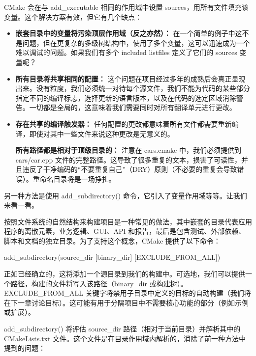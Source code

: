 CMake 会在与 add\_executable 相同的作用域中设置 sources，用所有文件填充该变量。这个解决方案有效，但它有几个缺点：

\begin{itemize}
\item
\textbf{嵌套目录中的变量将污染顶层作用域（反之亦然）：} 在一个简单的例子中这不是问题，但在更复杂的多级树结构中，使用了多个变量，这可以迅速成为一个难以调试的问题。如果我们有多个 included listfiles 定义了它们的 sources 变量呢？

\item
 \textbf{所有目录将共享相同的配置：} 这个问题在项目经过多年的成熟后会真正显现出来。没有粒度，我们必须统一对待每个源文件，我们不能为代码的某些部分指定不同的编译标志，选择更新的语言版本，以及在代码的选定区域消除警告。一切都是全局的，这意味着我们需要同时对所有翻译单元进行更改。

\item
\textbf{存在共享的编译触发器：} 任何配置的更改都意味着所有文件都需要重新编译，即使对其中一些文件来说这种更改是无意义的。

\textbf{所有路径都是相对于顶级目录的：} 注意在 cars.cmake 中，我们必须提供到 cars/car.cpp 文件的完整路径。这导致了很多重复的文本，损害了可读性，并且违反了干净编码的“不要重复自己”（DRY）原则（不必要的重复会导致错误）。重命名目录将是一场挣扎。
\end{itemize}

另一种方法是使用 add\_subdirectory() 命令，它引入了变量作用域等等。让我们来看一看。


按照文件系统的自然结构来构建项目是一种常见的做法，其中嵌套的目录代表应用程序的离散元素，业务逻辑、GUI、API 和报告，最后是包含测试、外部依赖、脚本和文档的独立目录。为了支持这个概念，CMake 提供了以下命令：

\begin{shell}
add_subdirectory(source_dir [binary_dir] [EXCLUDE_FROM_ALL])
\end{shell}

正如已经确立的，这将添加一个源目录到我们的构建中。可选地，我们可以提供一个路径，构建的文件将写入该路径（binary\_dir 或构建树）。EXCLUDE\_FROM\_ALL 关键字将禁用子目录中定义的目标的自动构建（我们将在下一章讨论目标）。这可能有用于分隔项目中不需要核心功能的部分（例如示例或扩展）。

add\_subdirectory() 将评估 source\_dir 路径（相对于当前目录）并解析其中的 CMakeLists.txt 文件。这个文件是在目录作用域内解析的，消除了前一种方法中提到的问题：

